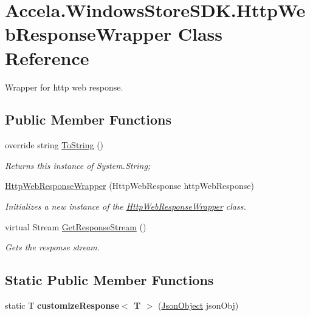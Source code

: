 \hypertarget{class_accela_1_1_windows_store_s_d_k_1_1_http_web_response_wrapper}{\section{Accela.\+Windows\+Store\+S\+D\+K.\+Http\+Web\+Response\+Wrapper Class Reference}
\label{class_accela_1_1_windows_store_s_d_k_1_1_http_web_response_wrapper}
}


Wrapper for http web response.  


\subsection*{Public Member Functions}
\begin{DoxyCompactItemize}
\item 
override string \hyperlink{class_accela_1_1_windows_store_s_d_k_1_1_http_web_response_wrapper_a07da870bc384d74d22edaf46713781d9}{To\+String} ()
\begin{DoxyCompactList}\small\item\em Returns this instance of System.\+String; \end{DoxyCompactList}\item 
\hyperlink{class_accela_1_1_windows_store_s_d_k_1_1_http_web_response_wrapper_a193b39a2558bd3760a476a8629fc5b98}{Http\+Web\+Response\+Wrapper} (Http\+Web\+Response http\+Web\+Response)
\begin{DoxyCompactList}\small\item\em Initializes a new instance of the \hyperlink{class_accela_1_1_windows_store_s_d_k_1_1_http_web_response_wrapper}{Http\+Web\+Response\+Wrapper} class. \end{DoxyCompactList}\item 
virtual Stream \hyperlink{class_accela_1_1_windows_store_s_d_k_1_1_http_web_response_wrapper_aa868d05be1a1ec95f64a5bbf8da9d736}{Get\+Response\+Stream} ()
\begin{DoxyCompactList}\small\item\em Gets the response stream. \end{DoxyCompactList}\end{DoxyCompactItemize}
\subsection*{Static Public Member Functions}
\begin{DoxyCompactItemize}
\item 
\hypertarget{class_accela_1_1_windows_store_s_d_k_1_1_http_web_response_wrapper_a9f3eb59480961e18e5b489a738569fc6}{static T {\bfseries customize\+Response$<$ T $>$} (\hyperlink{class_accela_1_1_windows_store_s_d_k_1_1_json_object}{Json\+Object} json\+Obj)}\label{class_accela_1_1_windows_store_s_d_k_1_1_http_web_response_wrapper_a9f3eb59480961e18e5b489a738569fc6}

\end{DoxyCompactItemize}
